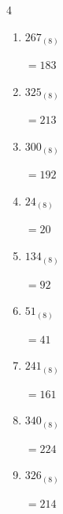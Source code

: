 \begin{multicols}{4}
\begin{enumerate}
        $=21$

  \item $267_{(8)}$

        $=183$

  \item $325_{(8)}$

        $=213$

  \item $300_{(8)}$

        $=192$

  \item $24_{(8)}$

        $=20$

  \item $134_{(8)}$

        $=92$

  \item $51_{(8)}$

        $=41$

  \item $241_{(8)}$

        $=161$

  \item $340_{(8)}$

        $=224$

  \item $326_{(8)}$

        $=214$

\end{enumerate}
\end{multicols}
